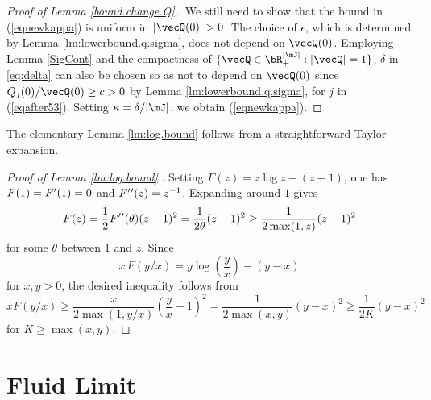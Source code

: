 \documentclass{amsart}
\begin{document}
\begin{proof}[Proof of Lemma \ref{bound.change.Q}.]
We still need to show that the bound in (\ref{eqnewkappa}) is uniform in
$|\vecQ(0)| >0$.  The choice of $\epsilon$, which is determined by Lemma
\ref{lm:lowerbound.q.sigma}, does not depend on $\vecQ(0)$.
Employing Lemma \ref{SigCont}
and  the compactness of $\{\vecQ\in\bR_+^{|\mJ|}:|\vecQ|=1\}$, $\delta$ in \eqref{eq:delta} can also be chosen so as not to depend on
$\vecQ(0)$ since $Q_j (0)/\vecQ(0) \ge c >0$ by
Lemma \ref{lm:lowerbound.q.sigma}, for $j$ in (\ref{eqafter53}).
Setting $\kappa = \delta / |\mJ|$, we obtain (\ref{eqnewkappa}).
\end{proof}

The elementary Lemma \ref{lm:log.bound} follows from a straightforward Taylor expansion.

\begin{proof}[Proof of Lemma \ref{lm:log.bound}.]
Setting
$F(z) = z\log z - (z-1)$, one has $F(1) = F\rq{}(1)= 0$ and $F\rq{}\rq{}(z) = z^{-1}$.  Expanding around $1$ gives 
$$
F(z) = \frac{1}{2} F\rq{}\rq{}(\theta) (z-1)^2 
= \frac{1}{2\theta} (z-1)^2 \geq \frac{1}{2 \max(1,z)} (z-1)^2 
$$
 for some $\theta$ between $1$ and $z$.
Since
\[
x\, F(y/x)=y\log \left(\frac{y}{x}\right) - (y-x)
\]
for $x,y >0$, the desired inequality follows from
$$
 x F(y/x) 
 \geq \frac{x}{2 \max(1,y/x )} \left(\frac{y}{x}-1\right)^2
= \frac{1}{2 \max(x,y) } (y-x)^2 
 \geq \frac{1}{2 K} (y-x)^2 
$$
for $K\ge \max(x,y)$.
\end{proof}

\section{Fluid Limit}
\label{appendFMFL}
\end{document}
